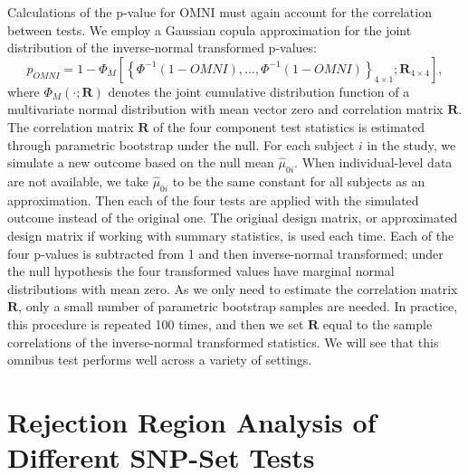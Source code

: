 \documentclass[12pt]{article}
\begin{document}
Calculations of the p-value for OMNI must again account for the correlation between tests. 
We employ a Gaussian copula approximation for the joint distribution of the inverse-normal transformed p-values:
\[
p_{OMNI}=1-\Phi_M\left[ \left \{ \Phi^{-1}(1-OMNI),...,\Phi^{-1}(1-OMNI) \right \}_{4\times 1};\mathbf{R}_{4\times4} \right],
\]
where $\Phi_M(\cdot;\mathbf{R})$ denotes the  joint cumulative distribution function 
of a multivariate  normal distribution  with mean vector zero and correlation matrix $\mathbf{R}$.   
The correlation matrix $\mathbf{R}$ of the four component test statistics is estimated through 
parametric bootstrap under the null. 
For each subject $i$ in the study, we simulate a new outcome based on the null 
mean $\widehat{\mu}_{0i}$.  
When individual-level data are not available, we take $\widehat{\mu}_{0i}$ to be the same 
constant for all subjects as an approximation.
Then each of the four tests are applied with the simulated outcome instead of the original one.
The original design matrix, or approximated design matrix if working with summary statistics, 
is used each time.
Each of the four p-values is subtracted from 1 and then inverse-normal transformed; under the null hypothesis the 
four transformed values have marginal normal distributions with mean zero.
As we only need to estimate the correlation matrix $\mathbf{R}$, only a small number
of parametric bootstrap samples are needed.
In practice, this procedure is repeated 100 times, and then we set $\mathbf{R}$  equal to the sample 
correlations of the inverse-normal transformed statistics.  
We will see that this omnibus test performs well across a variety of settings.


\section{Rejection Region Analysis of Different SNP-Set Tests}
\label{p2_sec:rej_region}
\end{document}
